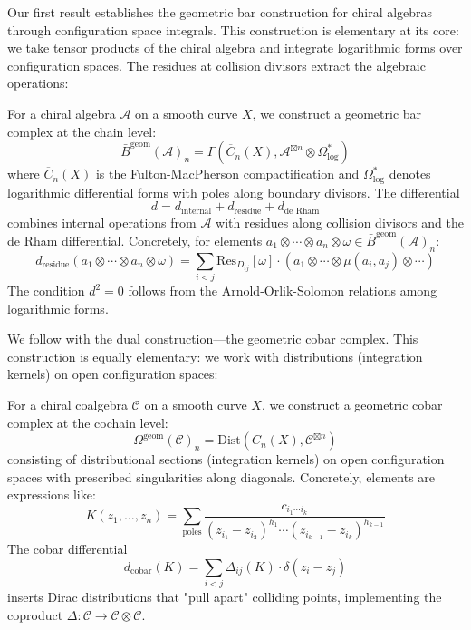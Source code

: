 Our first result establishes the geometric bar construction for chiral algebras through configuration space integrals. This construction is elementary at its core: we take tensor products of the chiral algebra and integrate logarithmic forms over configuration spaces. The residues at collision divisors extract the algebraic operations:

\begin{theorem}
For a chiral algebra $\mathcal{A}$ on a smooth curve $X$, we construct a geometric bar complex at the chain level:
$$\bar{B}^{\text{geom}}(\mathcal{A})_n = \Gamma\left(\overline{C}_n(X), \mathcal{A}^{\boxtimes n} \otimes \Omega^*_{\text{log}}\right)$$
where $\overline{C}_n(X)$ is the Fulton-MacPherson compactification and $\Omega^*_{\text{log}}$ denotes logarithmic differential forms with poles along boundary divisors. The differential 
$$d = d_{\text{internal}} + d_{\text{residue}} + d_{\text{de Rham}}$$
combines internal operations from $\mathcal{A}$ with residues along collision divisors and the de Rham differential. Concretely, for elements $a_1 \otimes \cdots \otimes a_n \otimes \omega \in \bar{B}^{\text{geom}}(\mathcal{A})_n$:
$$d_{\text{residue}}(a_1 \otimes \cdots \otimes a_n \otimes \omega) = \sum_{i<j} \text{Res}_{D_{ij}}[\omega] \cdot (a_1 \otimes \cdots \otimes \mu(a_i, a_j) \otimes \cdots)$$
The condition $d^2 = 0$ follows from the Arnold-Orlik-Solomon relations among logarithmic forms.
\end{theorem}

We follow with the dual construction—the geometric cobar complex. This construction is equally elementary: we work with distributions (integration kernels) on open configuration spaces:

\begin{theorem}
For a chiral coalgebra $\mathcal{C}$ on a smooth curve $X$, we construct a geometric cobar complex at the cochain level:
$$\Omega^{\text{geom}}(\mathcal{C})_n = \text{Dist}(C_n(X), \mathcal{C}^{\boxtimes n})$$
consisting of distributional sections (integration kernels) on open configuration spaces with prescribed singularities along diagonals. Concretely, elements are expressions like:
$$K(z_1, \ldots, z_n) = \sum_{\text{poles}} \frac{c_{i_1 \cdots i_k}}{(z_{i_1} - z_{i_2})^{h_1} \cdots (z_{i_{k-1}} - z_{i_k})^{h_{k-1}}}$$
The cobar differential
$$d_{\text{cobar}}(K) = \sum_{i<j} \Delta_{ij}(K) \cdot \delta(z_i - z_j)$$
inserts Dirac distributions that "pull apart" colliding points, implementing the coproduct $\Delta: \mathcal{C} \to \mathcal{C} \otimes \mathcal{C}$.
\end{theorem}

